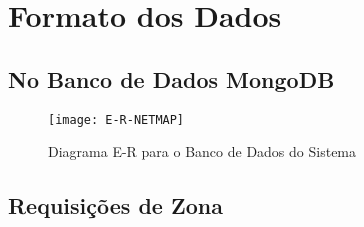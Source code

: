\chapter{Formato dos Dados}\label{chp:fd}







\section{No Banco de Dados MongoDB}



\begin{figure}[!h]
	\centering
	\caption{Diagrama E-R para o Banco de Dados do Sistema}
  \texttt{[image: E-R-NETMAP]}
\label{fig:e-r}  

\end{figure}





\section{Requisições de Zona}

